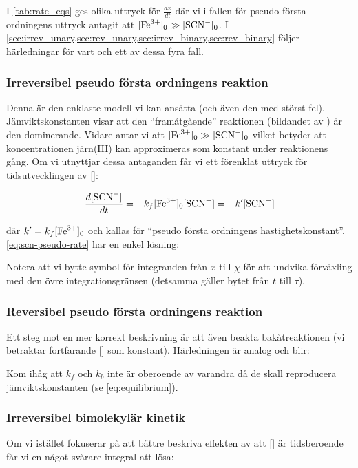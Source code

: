 

I \cref{tab:rate_eqs} ges olika uttryck för $\frac{dx}{dt}$ där vi i
fallen för pseudo första ordningens uttryck antagit att $[\ce{Fe^3+}]_0
\gg [\ce{SCN-}]_0$. I
\cref{sec:irrev_unary,sec:rev_unary,sec:irrev_binary,sec:rev_binary}
följer härledningar för vart och ett av dessa fyra fall.


\subsubsection{Irreversibel pseudo första ordningens reaktion}
\label{sec:irrev_unary}
Denna är den enklaste modell vi kan ansätta (och även den med störst fel).
Jämviktskonstanten visar att den ``framåtgående'' reaktionen (bildandet av )
är den dominerande. Vidare antar vi att $[\ce{Fe^3+}]_0 \gg [\ce{SCN-}]_0$ vilket
betyder att koncentrationen järn(III) kan approximeras som konstant under
reaktionens gång. Om vi utnyttjar dessa antaganden får vi ett förenklat
uttryck för tidsutvecklingen av []:

\begin{equation}
  \label{eq:scn-pseudo-rate}
  \frac{d[\ce{SCN-}]}{dt} = -k_f[\ce{Fe^3+}]_0[\ce{SCN-}] = -k'[\ce{SCN-}]
\end{equation}

där $k' = k_f[\ce{Fe^3+}]_0$ och kallas för ``pseudo första ordningens
hastighetskonstant''. \cref{eq:scn-pseudo-rate} har en enkel lösning: 



Notera att vi bytte symbol för integranden från $x$ till $\chi$ för att
undvika förväxling med den övre integrationsgränsen (detsamma gäller
bytet från $t$ till $\tau$).

\subsubsection{Reversibel pseudo första ordningens reaktion}
\label{sec:rev_unary}
Ett steg mot en mer korrekt beskrivning är att även beakta
bakåtreaktionen (vi betraktar fortfarande [] som
konstant). Härledningen är analog och blir:


Kom ihåg att $k_f$ och $k_b$ inte är oberoende av varandra då de skall reproducera
jämviktskonstanten (se \cref{eq:equilibrium}).

\subsubsection{Irreversibel bimolekylär kinetik}
\label{sec:irrev_binary}
Om vi istället fokuserar på att bättre beskriva effekten av att
[] är tidsberoende får vi en något svårare integral att lösa:

